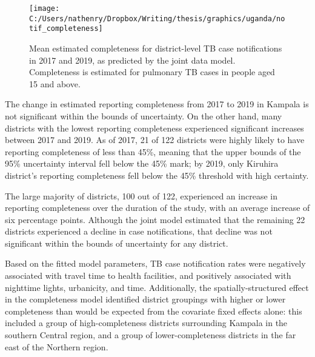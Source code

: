 \documentclass[
]{article}
\begin{document}
\begin{figure}[!ht]

{\centering \texttt{[image: C:/Users/nathenry/Dropbox/Writing/thesis/graphics/uganda/notif\_completeness]} 

}

\caption{Mean estimated completeness for district-level TB case notifications in 2017 and 2019, as predicted by the joint data model. Completeness is estimated for pulmonary TB cases in people aged 15 and above.}\label{fig:notif-completeness}
\end{figure}

The change in estimated reporting completeness from 2017 to 2019 in Kampala is not significant within the bounds of uncertainty. On the other hand, many districts with the lowest reporting completeness experienced significant increases between 2017 and 2019. As of 2017, 21 of 122 districts were highly likely to have reporting completeness of less than 45\%, meaning that the upper bounds of the 95\% uncertainty interval fell below the 45\% mark; by 2019, only Kiruhira district's reporting completeness fell below the 45\% threshold with high certainty.

The large majority of districts, 100 out of 122, experienced an increase in reporting completeness over the duration of the study, with an average increase of six percentage points. Although the joint model estimated that the remaining 22 districts experienced a decline in case notifications, that decline was not significant within the bounds of uncertainty for any district.

Based on the fitted model parameters, TB case notification rates were negatively associated with travel time to health facilities, and positively associated with nighttime lights, urbanicity, and time. Additionally, the spatially-structured effect in the completeness model identified district groupings with higher or lower completeness than would be expected from the covariate fixed effects alone: this included a group of high-completeness districts surrounding Kampala in the southern Central region, and a group of lower-completeness districts in the far east of the Northern region.
\end{document}
